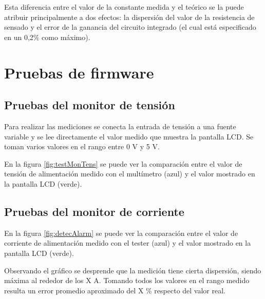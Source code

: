 Esta diferencia entre el valor de la constante medida y el teórico se la puede atribuir principalmente a dos efectos: la dispersión del valor de la resistencia de sensado y el error de la ganancia del circuito integrado (el cual está especificado en un 0,2\% como máximo).

\section{Pruebas de firmware}
\label{sec:pruebasFW}



\subsection{Pruebas del monitor de tensión}

Para realizar las mediciones se conecta la entrada de tensión a una fuente variable y se lee directamente el valor medido que muestra la pantalla LCD. Se toman varios valores en el rango entre 0 V y 5 V.

En la figura \ref{fig:testMonTens} se puede ver la comparación entre el valor de tensión de alimentación medido con el multímetro (azul) y el valor mostrado en la pantalla LCD (verde).


\subsection{Pruebas del monitor de corriente}

En la figura \ref{fig:detecAlarm} se puede ver la comparación entre el valor de corriente de alimentación medido con el tester (azul) y el valor mostrado en la pantalla LCD (verde).


Observando el gráfico se desprende que la medición tiene cierta dispersión, siendo máxima al rededor de los X A. Tomando todos los valores en el rango medido resulta un error promedio aproximado del X \% respecto del valor real.

